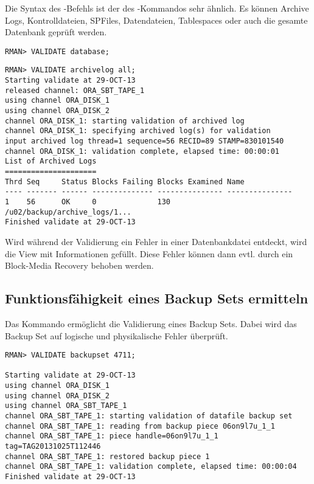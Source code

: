         Die Syntax des -Befehls ist der des -Kommandos sehr ähnlich. Es können Archive Logs, Kontrolldateien, SPFiles, Datendateien, Tablespaces oder auch die gesamte Datenbank geprüft werden.
\clearpage
        \begin{lstlisting}[caption={Eine ganze Datenbank validieren},label=admin1401,language=rman]
RMAN> VALIDATE database;
        \end{lstlisting}
        \begin{lstlisting}[caption={Validieren der Archive Logs},label=admin1402,language=rman]
RMAN> VALIDATE archivelog all;
Starting validate at 29-OCT-13
released channel: ORA_SBT_TAPE_1
using channel ORA_DISK_1
using channel ORA_DISK_2
channel ORA_DISK_1: starting validation of archived log
channel ORA_DISK_1: specifying archived log(s) for validation
input archived log thread=1 sequence=56 RECID=89 STAMP=830101540
channel ORA_DISK_1: validation complete, elapsed time: 00:00:01
List of Archived Logs
=====================
Thrd Seq     Status Blocks Failing Blocks Examined Name
---- ------- ------ -------------- --------------- ---------------
1    56      OK     0              130             /u02/backup/archive_logs/1...
Finished validate at 29-OCT-13
        \end{lstlisting}
        Wird während der Validierung ein Fehler in einer Datenbankdatei entdeckt, wird die View  mit Informationen gefüllt. Diese Fehler können dann evtl. durch ein Block-Media Recovery behoben werden.
      \subsection{Funktionsfähigkeit eines Backup Sets ermitteln}
        Das Kommando  ermöglicht die Validierung eines Backup Sets. Dabei wird das Backup Set auf logische und physikalische Fehler überprüft.
        \begin{lstlisting}[caption={Ein Backup Set validieren},label=admin1403,language=rman]
RMAN> VALIDATE backupset 4711;

Starting validate at 29-OCT-13
using channel ORA_DISK_1
using channel ORA_DISK_2
using channel ORA_SBT_TAPE_1
channel ORA_SBT_TAPE_1: starting validation of datafile backup set
channel ORA_SBT_TAPE_1: reading from backup piece 06on9l7u_1_1
channel ORA_SBT_TAPE_1: piece handle=06on9l7u_1_1 tag=TAG20131025T112446
channel ORA_SBT_TAPE_1: restored backup piece 1
channel ORA_SBT_TAPE_1: validation complete, elapsed time: 00:00:04
Finished validate at 29-OCT-13
        \end{lstlisting}
